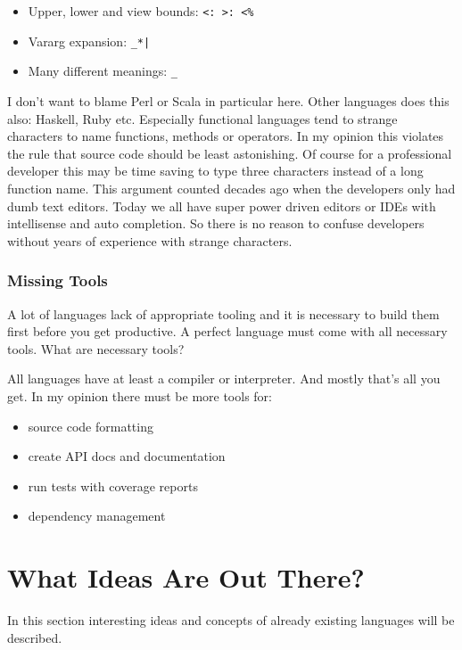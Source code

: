 \documentclass[12pt,a4paper]{report}
\begin{document}
\begin{itemize}
    \item Upper, lower and view bounds: \texttt{<: >: <\%}
    \item Vararg expansion: \texttt{\_*|}
    \item Many different meanings: \texttt{\_}
\end{itemize}

I don't want to blame Perl or Scala in particular here. Other languages does this also: Haskell, Ruby etc. Especially functional languages tend to strange characters to name functions, methods or operators. In my opinion this violates the rule that source code should be least astonishing. Of course for a professional developer this may be time saving to type three characters instead of a long function name. This argument counted decades ago when the developers only had dumb text editors. Today we all have super power driven editors or IDEs with intellisense and auto completion. So there is no reason to confuse developers without years of experience with strange characters.

\subsection{Missing Tools}

A lot of languages lack of appropriate tooling and it is necessary to build them first before you get productive. A perfect language must come with all necessary tools. What are necessary tools?

All languages have at least a compiler or interpreter. And mostly that's all you get. In my opinion there must be more tools for:

\begin{itemize}
    \item source code formatting
    \item create API docs and documentation
    \item run tests with coverage reports
    \item dependency management
\end{itemize}

\chapter{What Ideas Are Out There?}

In this section interesting ideas and concepts of already existing languages will be described.
\end{document}

